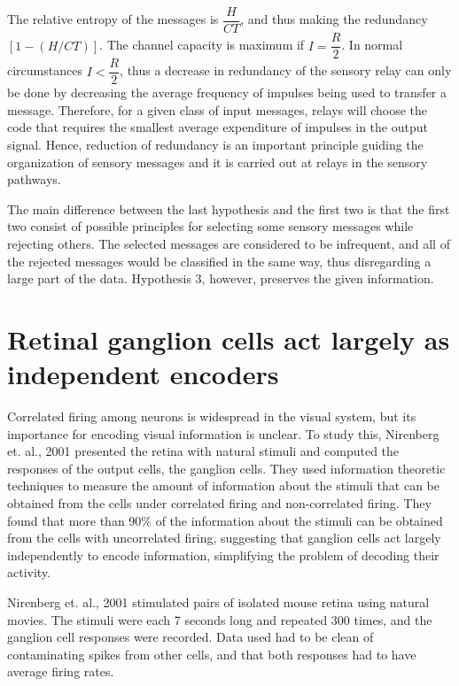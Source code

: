 \documentclass[twoside]{article}
\begin{document}
\begin{multicols}{2}
The relative entropy of the messages is $\dfrac{H}{CT}$, and thus making the redundancy $[1-(H/CT)]$. The channel capacity is maximum if $I = \dfrac{R}2$. In normal circumstances $I < \dfrac{R}{2}$, thus a decrease in redundancy of the sensory relay can only be done by decreasing the average frequency of impulses being used to transfer a message. Therefore, for a given class of input messages, relays will choose the code that requires the smallest average expenditure of impulses in the output signal. Hence, reduction of redundancy is an important principle guiding the organization of sensory messages and it is carried out at relays in the sensory pathways.

The main difference between the last hypothesis and the first two is that the first two consist of possible principles for selecting some sensory messages while rejecting others. The selected messages are considered to be infrequent, and all of the rejected messages would be classified in the same way, thus disregarding a large part of the data. Hypothesis 3, however, preserves the given information.








\section{Retinal ganglion cells act largely as independent encoders}

\footnotesize
Correlated firing among neurons is widespread in the visual system, but its importance for encoding visual information is unclear. To study this, Nirenberg et. al., 2001 presented the retina with natural stimuli and computed the responses of the output cells, the ganglion cells. They used information theoretic techniques to measure the amount of information about the stimuli that can be obtained from the cells under correlated firing and non-correlated firing. They found that more than 90\% of the information about the stimuli can be obtained from the cells with uncorrelated firing, suggesting that ganglion cells act largely independently to encode information, simplifying the problem of decoding their activity. 

\normalsize
Nirenberg et. al., 2001 stimulated pairs of isolated mouse retina using natural movies. The stimuli were each 7 seconds long and repeated 300 times, and the ganglion cell responses were recorded. Data used had to be clean of contaminating spikes from other cells, and that both responses had to have average firing rates. 


\end{multicols}
\end{document}
